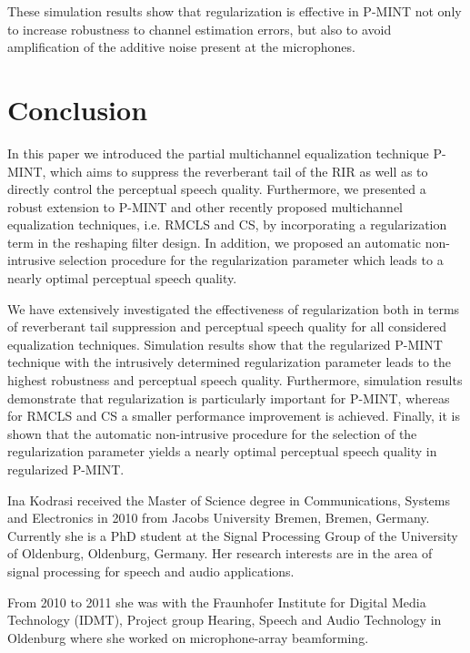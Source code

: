 \documentclass[10pt]{IEEEtran}
\begin{document}
These simulation results show that regularization is effective in P-MINT not only to increase robustness to channel estimation errors, but also to avoid amplification of the additive noise present at the microphones. 
\section{Conclusion}
In this paper we introduced the partial multichannel equalization technique P-MINT, which aims to suppress the reverberant tail of the RIR as well as to directly control the perceptual speech quality.
Furthermore, we presented a robust extension to P-MINT and other recently proposed multichannel equalization techniques, i.e. RMCLS and CS, by incorporating a regularization term in the reshaping filter design.
In addition, we proposed an automatic non-intrusive selection procedure for the regularization parameter which leads to a nearly optimal perceptual speech quality.

We have extensively investigated the effectiveness of regularization both in terms of reverberant tail suppression and perceptual speech quality for all considered equalization techniques.
Simulation results show that the regularized P-MINT technique with the intrusively determined regularization parameter leads to the highest robustness and perceptual speech quality.
Furthermore, simulation results demonstrate that regularization is particularly important for P-MINT, whereas for RMCLS and CS a smaller performance improvement is achieved.
Finally, it is shown that the automatic non-intrusive procedure for the selection of the regularization parameter yields a nearly optimal perceptual speech quality in regularized P-MINT.





\vspace{-1cm}
\begin{IEEEbiography}
{Ina Kodrasi} received the Master of Science degree in Communications, Systems and Electronics in 2010 from Jacobs University Bremen, Bremen, Germany.
Currently she is a PhD student at the Signal Processing Group of the University of Oldenburg, Oldenburg, Germany.
Her research interests are in the area of signal processing for speech and audio applications.

From 2010 to 2011 she was with the Fraunhofer Institute for Digital Media Technology (IDMT), Project group
Hearing, Speech and Audio Technology in Oldenburg where she worked on microphone-array beamforming.
\vspace{-1cm}
\end{IEEEbiography}
\end{document}

